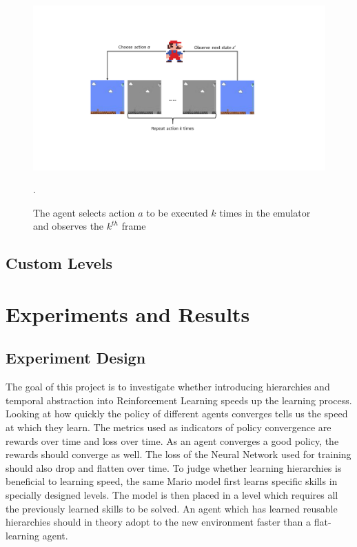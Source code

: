 \documentclass[notitlepage,a4paper,11pt]{article}
\begin{document}
\begin{figure}[!htb]
\centering
\includegraphics[trim={0 4cm 0 4cm}, clip, width=1\linewidth]{figs/frame_skipping.png}
\caption{The agent selects action $a$ to be executed $k$ times in the emulator and observes the $k^{th}$ frame}.
\end{figure}

\subsection{Custom Levels}


\section{Experiments and Results}

\subsection{Experiment Design}
The goal of this project is to investigate whether introducing hierarchies and temporal abstraction into Reinforcement Learning speeds up the learning process. Looking at how quickly the policy of different agents converges tells us the speed at which they learn. The metrics used as indicators of policy convergence are rewards over time and loss over time. As an agent converges a good policy, the rewards should converge as well. The loss of the Neural Network used for training should also drop and flatten over time. To judge whether learning hierarchies is beneficial to learning speed, the same Mario model first learns specific skills in specially designed levels. The model is then placed in a level which requires all the previously learned skills to be solved. An agent which has learned reusable hierarchies should in theory adopt to the new environment faster than a flat-learning agent.
\end{document}
